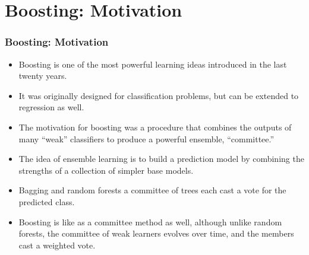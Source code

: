 \documentclass[
  shownotes,
  xcolor={svgnames},
  hyperref={colorlinks,citecolor=DarkBlue,linkcolor=DarkRed,urlcolor=DarkBlue}
  , aspectratio=169]{beamer}
\begin{document}
\section{Boosting: Motivation}
\begin{frame}[fragile]
\frametitle{Boosting: Motivation}

\begin{itemize}

\item Boosting is one of the most powerful learning ideas introduced in the last twenty years. 

\item It was originally designed for classification problems, but  can  be extended to regression as well. 

\item The motivation for boosting was a procedure that combines the outputs of many “weak” classifiers to produce a powerful ensemble, “committee.” 


\item The idea of ensemble learning is to build a prediction model by combining the strengths of a collection of simpler base models.

\item  Bagging and random forests a committee of trees each cast a vote for the predicted class. 

\item Boosting is like as a committee method as well, although unlike random forests, the committee of weak learners evolves over time, and the members cast a weighted vote.


\end{itemize}

\end{frame}

\end{document}
